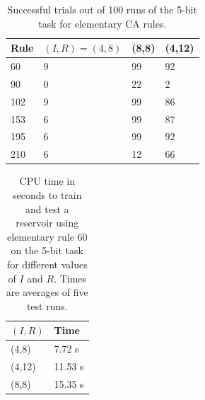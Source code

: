 \documentclass{elsarticle}
\begin{document}
\begin{multicols}{2}
	
	\begin{table}[H] \centering
		\begin{tabular}{|l|l|l|l|}
			\hline
			\textbf{Rule} & \boldmath$(I,R)=(4,8)$ & \textbf{(8,8)} & \textbf{(4,12)} \\ 
			\hline
			60            & 9                      & 99             & 92              \\ \hline
			90            & 0                      & 22             & 2               \\ \hline
			102           & 9                      & 99             & 86              \\ \hline
			153           & 6                      & 99             & 87              \\ \hline
			195           & 6                      & 99             & 92              \\ \hline
			210           & 6                      & 12             & 66              \\ \hline
		\end{tabular}
		\caption{Successful trials out of 100 runs of the 5-bit task for elementary CA 
		rules.}
		\label{table:elementary}
	\end{table}
	
	\begin{table}[H] \centering
		\begin{tabular}{|l|l|}
			\hline
			\boldmath$(I,R)$ & \textbf{Time} \\ \hline
			(4,8)            & 7.72 s        \\ \hline
			(4,12)           & 11.53 s       \\ \hline
			(8,8)            & 15.35 s       \\ \hline
		\end{tabular}
		\caption{CPU time in seconds to train and test a reservoir using elementary 
			rule 60 on the 5-bit task for different values of $I$ and $R$. Times are 
		averages of five test runs.}
		\label{table:time}
	\end{table}
	
	

\end{multicols}
\end{document}

